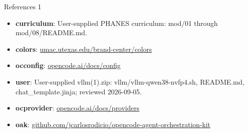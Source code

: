 \documentclass[aspectratio=169,11pt]{beamer}
\begin{document}
\begin{frame}[t]{References 1}
\fontsize{9}{12}\selectfont\begin{itemize}\setlength{\itemsep}{3mm}
\item \textbf{curriculum}: User-supplied PHANES curriculum: mod/01 through mod/08/README.md.
\item \textbf{colors}: \href{https://umac.utexas.edu/brand-center/colors/}{umac.utexas.edu/brand-center/colors}
\item \textbf{occonfig}: \href{https://opencode.ai/docs/config/}{opencode.ai/docs/config}
\item \textbf{user}: User-supplied vllm(1).zip: vllm/vllm-qwen38-nvfp4.sh, README.md, chat\_template.jinja; reviewed 2026-09-05.
\item \textbf{ocprovider}: \href{https://opencode.ai/docs/providers/}{opencode.ai/docs/providers}
\item \textbf{oak}: \href{https://github.com/jcarlosrodicio/opencode-agent-orchestration-kit}{github.com/jcarlosrodicio/opencode-agent-orchestration-kit}
\end{itemize}\end{frame}
\end{document}
